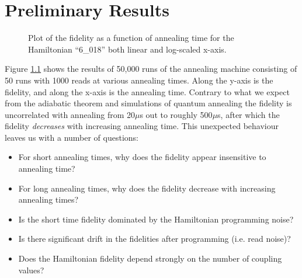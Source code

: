 \chapter{Preliminary Results}

\begin{figure}[h]
	\caption[Fidelity vs Time]{Plot of the fidelity as a function of annealing time for the Hamiltonian ``6\_018'' both linear and log-scaled x-axis.}
	\label{fig:fidelity}
\end{figure}

Figure \ref{fig:fidelity} shows the results of 50,000 runs of the annealing machine consisting of 50 runs with 1000 reads at various annealing times.  Along the y-axis is the fidelity, and along the x-axis is the annealing time.  Contrary to what we expect from the adiabatic theorem and simulations of quantum annealing the fidelity is uncorrelated with annealing from 20$\mu$s out to roughly 500$ \mu$s, after which the fidelity \emph{decreases} with increasing annealing time.  This unexpected behaviour leaves us with a number of questions:

\begin{itemize}
	\item For short annealing times, why does the fidelity appear insensitive to annealing time?
	\item For long annealing times, why does the fidelity decrease with increasing annealing times?
	\item Is the short time fidelity dominated by the Hamiltonian programming noise?
	\item Is there significant drift in the fidelities after programming (i.e. read noise)?
	\item Does the Hamiltonian fidelity depend strongly on the number of coupling values?
\end{itemize}


